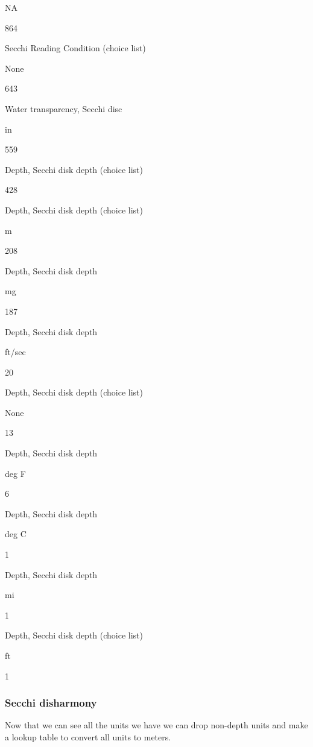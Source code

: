 \documentclass[]{article}
\begin{document}
NA

864

Secchi Reading Condition (choice list)

None

643

Water transparency, Secchi disc

in

559

Depth, Secchi disk depth (choice list)

428

Depth, Secchi disk depth (choice list)

m

208

Depth, Secchi disk depth

mg

187

Depth, Secchi disk depth

ft/sec

20

Depth, Secchi disk depth (choice list)

None

13

Depth, Secchi disk depth

deg F

6

Depth, Secchi disk depth

deg C

1

Depth, Secchi disk depth

mi

1

Depth, Secchi disk depth (choice list)

ft

1

\hypertarget{secchi-disharmony}{%
\subsubsection{Secchi disharmony}\label{secchi-disharmony}}

Now that we can see all the units we have we can drop non-depth units
and make a lookup table to convert all units to meters.
\end{document}
